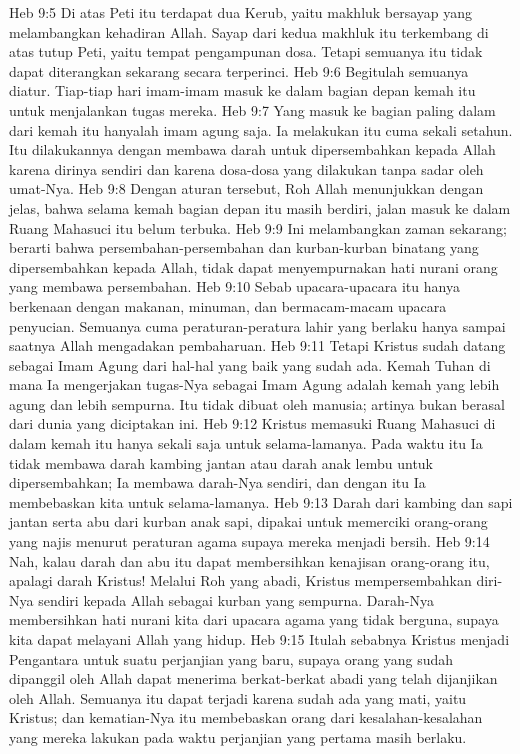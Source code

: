 Heb 9:5  Di atas Peti itu terdapat dua Kerub, yaitu makhluk bersayap yang melambangkan kehadiran Allah. Sayap dari kedua makhluk itu terkembang di atas tutup Peti, yaitu tempat pengampunan dosa. Tetapi semuanya itu tidak dapat diterangkan sekarang secara terperinci.
Heb 9:6  Begitulah semuanya diatur. Tiap-tiap hari imam-imam masuk ke dalam bagian depan kemah itu untuk menjalankan tugas mereka.
Heb 9:7  Yang masuk ke bagian paling dalam dari kemah itu hanyalah imam agung saja. Ia melakukan itu cuma sekali setahun. Itu dilakukannya dengan membawa darah untuk dipersembahkan kepada Allah karena dirinya sendiri dan karena dosa-dosa yang dilakukan tanpa sadar oleh umat-Nya.
Heb 9:8  Dengan aturan tersebut, Roh Allah menunjukkan dengan jelas, bahwa selama kemah bagian depan itu masih berdiri, jalan masuk ke dalam Ruang Mahasuci itu belum terbuka.
Heb 9:9  Ini melambangkan zaman sekarang; berarti bahwa persembahan-persembahan dan kurban-kurban binatang yang dipersembahkan kepada Allah, tidak dapat menyempurnakan hati nurani orang yang membawa persembahan.
Heb 9:10  Sebab upacara-upacara itu hanya berkenaan dengan makanan, minuman, dan bermacam-macam upacara penyucian. Semuanya cuma peraturan-peratura lahir yang berlaku hanya sampai saatnya Allah mengadakan pembaharuan.
Heb 9:11  Tetapi Kristus sudah datang sebagai Imam Agung dari hal-hal yang baik yang sudah ada. Kemah Tuhan di mana Ia mengerjakan tugas-Nya sebagai Imam Agung adalah kemah yang lebih agung dan lebih sempurna. Itu tidak dibuat oleh manusia; artinya bukan berasal dari dunia yang diciptakan ini.
Heb 9:12  Kristus memasuki Ruang Mahasuci di dalam kemah itu hanya sekali saja untuk selama-lamanya. Pada waktu itu Ia tidak membawa darah kambing jantan atau darah anak lembu untuk dipersembahkan; Ia membawa darah-Nya sendiri, dan dengan itu Ia membebaskan kita untuk selama-lamanya.
Heb 9:13  Darah dari kambing dan sapi jantan serta abu dari kurban anak sapi, dipakai untuk memerciki orang-orang yang najis menurut peraturan agama supaya mereka menjadi bersih.
Heb 9:14  Nah, kalau darah dan abu itu dapat membersihkan kenajisan orang-orang itu, apalagi darah Kristus! Melalui Roh yang abadi, Kristus mempersembahkan diri-Nya sendiri kepada Allah sebagai kurban yang sempurna. Darah-Nya membersihkan hati nurani kita dari upacara agama yang tidak berguna, supaya kita dapat melayani Allah yang hidup.
Heb 9:15  Itulah sebabnya Kristus menjadi Pengantara untuk suatu perjanjian yang baru, supaya orang yang sudah dipanggil oleh Allah dapat menerima berkat-berkat abadi yang telah dijanjikan oleh Allah. Semuanya itu dapat terjadi karena sudah ada yang mati, yaitu Kristus; dan kematian-Nya itu membebaskan orang dari kesalahan-kesalahan yang mereka lakukan pada waktu perjanjian yang pertama masih berlaku.
